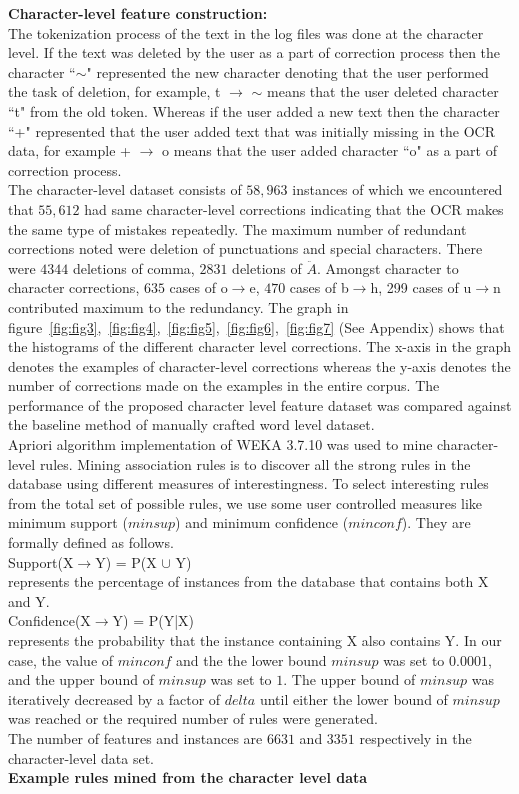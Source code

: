 \documentclass{sig-alternate}
\begin{document}
\begin{enumerate}
\begin{itemize}
\textbf{Character-level feature construction:}\\
The tokenization process of the text in the log files was done at the character level. If the text was deleted by the user as a part of correction process then the character ``$\sim$" represented the new character denoting that the user performed the task of deletion, for example, t $\rightarrow$ $\sim$ means that the user deleted character ``t" from the old token. Whereas if the user added a new text  then the character ``+" represented that the user added text that was initially missing in the OCR data, for example + $\rightarrow$ o means that the user added character ``o" as a part of correction process. \\
The character-level dataset consists of $58,963$ instances of which we encountered that $55,612$ had same character-level corrections indicating that the OCR makes the same type of mistakes repeatedly. The maximum number of redundant corrections noted were deletion of punctuations and special characters. There were $4344$ deletions of comma, $2831$ deletions of $\ddot{A}$. Amongst character to character corrections, $635$ cases of o$\rightarrow$e, $470$ cases of b$\rightarrow$h, 299 cases of u$\rightarrow$n contributed maximum to the redundancy. The graph in figure~\ref{fig:fig3},~\ref{fig:fig4},~\ref{fig:fig5},~\ref{fig:fig6},~\ref{fig:fig7}  (See Appendix) shows that the histograms of the different character level corrections.
The x-axis in the graph denotes the examples of character-level corrections whereas the y-axis denotes the number of corrections made on the examples in the entire corpus. The performance of the proposed character level feature dataset was compared against the baseline method of manually crafted word level dataset.\\
Apriori algorithm \cite{Agrawal1994} implementation of WEKA 3.7.10 was used to mine character-level rules. Mining association rules is to discover all the strong rules in the database using different measures of interestingness. To select interesting rules from the total set of possible rules, we use some user controlled measures like minimum support ($minsup$) and minimum confidence ($minconf$). They are formally defined as follows. \\
Support(X$\rightarrow$Y) = P(X $\cup$ Y)\\
represents the percentage of instances from the database that contains both X and Y.\\
Confidence(X$\rightarrow$Y) = P(Y|X)\\ 
represents the probability that the instance containing X also contains Y.
In our case, the value of $minconf$ and the the lower bound $minsup$ was set to $0.0001$, and the upper bound of $minsup$ was set to $1$. The upper bound of $minsup$ was iteratively decreased by a factor of $delta$ until either the lower bound of $minsup$ was reached or the required number of rules were generated.\\
The number of features and instances are $6631$ and $3351$ respectively in the character-level data set.\\
\textbf{Example rules mined from the character level data}


\end{itemize}
\end{enumerate}
\end{document}
